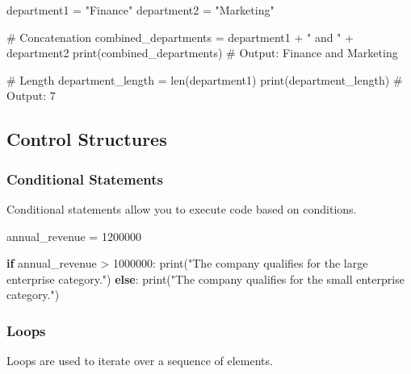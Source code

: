 \documentclass[
  letterpaper,
  DIV=11,
  numbers=noendperiod]{scrreprt}
\newenvironment{Shaded}{\begin{snugshade}}{\end{snugshade}}
\newcommand{\BuiltInTok}[1]{\textcolor[rgb]{0.00,0.23,0.31}{#1}}
\newcommand{\CommentTok}[1]{\textcolor[rgb]{0.37,0.37,0.37}{#1}}
\newcommand{\ControlFlowTok}[1]{\textcolor[rgb]{0.00,0.23,0.31}{\textbf{#1}}}
\newcommand{\DecValTok}[1]{\textcolor[rgb]{0.68,0.00,0.00}{#1}}
\newcommand{\NormalTok}[1]{\textcolor[rgb]{0.00,0.23,0.31}{#1}}
\newcommand{\OperatorTok}[1]{\textcolor[rgb]{0.37,0.37,0.37}{#1}}
\newcommand{\StringTok}[1]{\textcolor[rgb]{0.13,0.47,0.30}{#1}}
\begin{document}
\begin{Shaded}
\begin{Highlighting}[]
\NormalTok{department1 }\OperatorTok{=} \StringTok{"Finance"}
\NormalTok{department2 }\OperatorTok{=} \StringTok{"Marketing"}

\CommentTok{\# Concatenation}
\NormalTok{combined\_departments }\OperatorTok{=}\NormalTok{ department1 }\OperatorTok{+} \StringTok{" and "} \OperatorTok{+}\NormalTok{ department2}
\BuiltInTok{print}\NormalTok{(combined\_departments)  }\CommentTok{\# Output: Finance and Marketing}

\CommentTok{\# Length}
\NormalTok{department\_length }\OperatorTok{=} \BuiltInTok{len}\NormalTok{(department1)}
\BuiltInTok{print}\NormalTok{(department\_length)  }\CommentTok{\# Output: 7}
\end{Highlighting}
\end{Shaded}

\subsection{Control Structures}\label{control-structures}

\subsubsection{Conditional Statements}\label{conditional-statements}

Conditional statements allow you to execute code based on conditions.

\begin{Shaded}
\begin{Highlighting}[]
\NormalTok{annual\_revenue }\OperatorTok{=} \DecValTok{1200000}

\ControlFlowTok{if}\NormalTok{ annual\_revenue }\OperatorTok{\textgreater{}} \DecValTok{1000000}\NormalTok{:}
    \BuiltInTok{print}\NormalTok{(}\StringTok{"The company qualifies for the large enterprise category."}\NormalTok{)}
\ControlFlowTok{else}\NormalTok{:}
    \BuiltInTok{print}\NormalTok{(}\StringTok{"The company qualifies for the small enterprise category."}\NormalTok{)}
\end{Highlighting}
\end{Shaded}

\subsubsection{Loops}\label{loops}

Loops are used to iterate over a sequence of elements.
\end{document}
